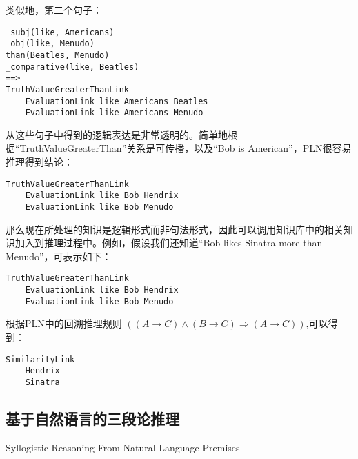 \noindent 类似地，第二个句子：

 {\tt\begin{small}\begin{lstlisting}
_subj(like, Americans)
_obj(like, Menudo)
than(Beatles, Menudo)
_comparative(like, Beatles)
==>
TruthValueGreaterThanLink
    EvaluationLink like Americans Beatles
    EvaluationLink like Americans Menudo
\end{lstlisting}\end{small}}

从这些句子中得到的逻辑表达是非常透明的。简单地根据“TruthValueGreaterThan”关系是可传播，以及“Bob is American”，PLN很容易推理得到结论：

 {\tt\begin{small}\begin{lstlisting}
TruthValueGreaterThanLink
    EvaluationLink like Bob Hendrix
    EvaluationLink like Bob Menudo
  \end{lstlisting}\end{small}}
  
那么现在所处理的知识是逻辑形式而非句法形式，因此可以调用知识库中的相关知识加入到推理过程中。例如，假设我们还知道“Bob likes Sinatra more than Menudo”，可表示如下：
    
     {\tt\begin{small}\begin{lstlisting}
TruthValueGreaterThanLink
    EvaluationLink like Bob Hendrix
    EvaluationLink like Bob Menudo
  \end{lstlisting}\end{small}}
  
  
  \noindent 根据PLN中的回溯推理规则 $\left((A\rightarrow C) \wedge (B\rightarrow C) \Rightarrow(A\rightarrow C)\right)$,可以得到：
  
     {\tt\begin{small}\begin{lstlisting}
SimilarityLink
    Hendrix
    Sinatra
  \end{lstlisting}\end{small}}
  
 

\subsection{基于自然语言的三段论推理}{Syllogistic Reasoning From Natural Language Premises}

